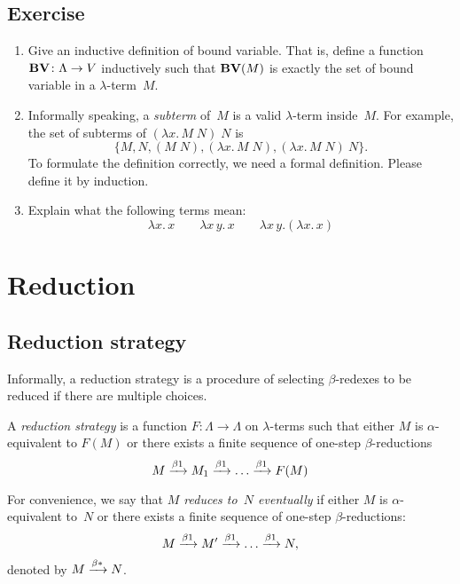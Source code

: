 \subsection*{Exercise}
\begin{enumerate}
  \item Give an inductive definition of bound variable. That is, define a
    function $\mathbf{BV}\colon \Lambda \to V$ inductively
    such that $\mathbf{BV}(M)$ is exactly the set of bound variable in a
    $\lambda$-term~$M$.
  \item Informally speaking, a \emph{subterm} of~$M$ is a valid $\lambda$-term
    inside~$M$. For example, the set of subterms of $(\lambda x.\, M\;N)\;N$ is
    \[
      \{M, N, (M\;N), (\lambda x.\, M\;N), (\lambda x.\, M\;N)\:N\}.
    \]
    To formulate the definition correctly, we need a formal definition. Please
    define it by induction.
  \item Explain what the following terms mean:
    \[
      \lambda x.\,x
      \qquad
      \lambda x\,y.\,x
      \qquad
      \lambda x\,y. (\lambda x.\, x)
    \]
\end{enumerate}

\section{Reduction}
\subsection{Reduction strategy}
Informally, a reduction strategy is a procedure of selecting $\beta$-redexes
to be reduced if there are multiple choices. 
\begin{definition}
  A \emph{reduction strategy} is a function $F\colon\Lambda\to\Lambda$ on
  $\lambda$-terms such that either $M$ is $\alpha$-equivalent to $F(M)$ or there
  exists a finite sequence of one-step $\beta$-reductions
      \[
        M \xrightarrow{\beta1} M_1 \xrightarrow{\beta1} \dots \xrightarrow{\beta1} F(M)
      \]
\end{definition}
For convenience, we say that \emph{$M$ reduces to~$N$ eventually} if either $M$ is
$\alpha$-equivalent to~$N$ or there exists a finite sequence of
one-step $\beta$-reductions:
\[
  M \xrightarrow{\beta1} M' \xrightarrow{\beta1} \dots \xrightarrow{\beta1} N,
\]
denoted by $M \xrightarrow{\beta*} N$.

